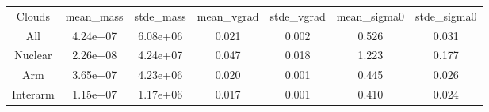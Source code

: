 \begin{table}
\begin{tabular}{ccccccc}
Clouds & mean_mass & stde_mass & mean_vgrad & stde_vgrad & mean_sigma0 & stde_sigma0 \\
All & 4.24e+07 & 6.08e+06 & 0.021 & 0.002 & 0.526 & 0.031 \\
Nuclear & 2.26e+08 & 4.24e+07 & 0.047 & 0.018 & 1.223 & 0.177 \\
Arm & 3.65e+07 & 4.23e+06 & 0.020 & 0.001 & 0.445 & 0.026 \\
Interarm & 1.15e+07 & 1.17e+06 & 0.017 & 0.001 & 0.410 & 0.024 \\
\end{tabular}
\end{table}
